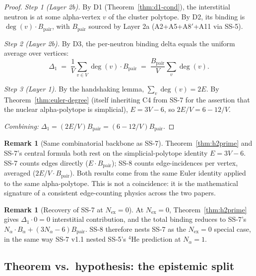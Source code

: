 \documentclass[11pt,letterpaper]{article}
\theoremstyle{definition}
\newtheorem{remark}[theorem]{Remark}
\newcommand{\Bpair}{B_{\text{pair}}}
\newcommand{\Nalpha}{N_\alpha}
\newcommand{\Nex}{N_{\text{ex}}}
\newcommand{\degv}{\deg(v)}
\begin{document}
\begin{proof}
\emph{Step 1 (Layer 2b).} By D1 (Theorem~\ref{thm:d1-cond}), the interstitial neutron is at some alpha-vertex $v$ of the cluster polytope. By D2, its binding is $\degv \cdot \Bpair$, with $\Bpair$ sourced by Layer 2a (A2+A5+A8$'$+A11 via SS-5).

\emph{Step 2 (Layer 2b).} By D3, the per-neutron binding delta equals the uniform average over vertices:
\[
\Delta_1 \;=\; \frac{1}{V} \sum_{v \in V} \degv \cdot \Bpair \;=\; \frac{\Bpair}{V} \sum_v \degv.
\]

\emph{Step 3 (Layer 1).} By the handshaking lemma, $\sum_v \degv = 2E$. By Theorem~\ref{thm:euler-degree} (itself inheriting C4 from SS-7 for the assertion that the nuclear alpha-polytope is simplicial), $E = 3V - 6$, so $2E/V = 6 - 12/V$.

\emph{Combining:} $\Delta_1 = (2E/V) \Bpair = (6 - 12/V) \Bpair$.
\end{proof}

\begin{remark}[Same combinatorial backbone as SS-7]
\label{rem:ss7-backbone}
Theorem~\ref{thm:h2prime} and SS-7's central formula both rest on the simplicial-polytope identity $E = 3V - 6$. SS-7 counts edges directly ($E \cdot \Bpair$); SS-8 counts edge-incidences per vertex, averaged ($2E/V \cdot \Bpair$). Both results come from the same Euler identity applied to the same alpha-polytope. This is not a coincidence: it is the mathematical signature of a consistent edge-counting physics across the two papers.
\end{remark}

\begin{remark}[Recovery of SS-7 at $\Nex = 0$]
\label{rem:ss7-recovery}
At $\Nex = 0$, Theorem~\ref{thm:h2prime} gives $\Delta_1 \cdot 0 = 0$ interstitial contribution, and the total binding reduces to SS-7's $\Nalpha \cdot B_\alpha + (3\Nalpha - 6)\Bpair$. SS-8 therefore nests SS-7 as the $\Nex = 0$ special case, in the same way SS-7 v1.1 nested SS-5's ${}^{4}\mathrm{He}$ prediction at $\Nalpha = 1$.
\end{remark}

\subsection{Theorem vs.\ hypothesis: the epistemic split}
\label{sec:epistemic-split}
\end{document}
